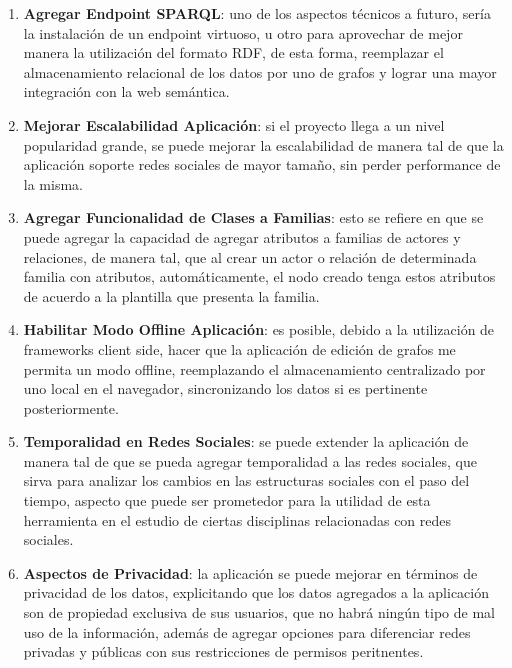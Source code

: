   \begin{enumerate}
    \item \textbf{Agregar Endpoint SPARQL}: uno de los aspectos técnicos a futuro, sería la instalación de un endpoint virtuoso, u otro para aprovechar de mejor manera la utilización del formato RDF, de esta forma, reemplazar el almacenamiento relacional de los datos por uno de grafos y lograr una mayor integración con la web semántica.
    
    \item \textbf{Mejorar Escalabilidad Aplicación}: si el proyecto llega a un nivel popularidad grande, se puede mejorar la escalabilidad de manera tal de que la aplicación soporte redes sociales de mayor tamaño, sin perder performance de la misma.
    
    \item \textbf{Agregar Funcionalidad de Clases a Familias}: esto se refiere en que se puede agregar la capacidad de agregar atributos a familias de actores y relaciones, de manera tal, que al crear un actor o relación de determinada familia con atributos, automáticamente, el nodo creado tenga estos atributos de acuerdo a la plantilla que presenta la familia.
    
    \item \textbf{Habilitar Modo Offline Aplicación}: es posible, debido a la utilización de frameworks client side, hacer que la aplicación de edición de grafos me permita un modo offline, reemplazando el almacenamiento centralizado por uno local en el navegador, sincronizando los datos si es pertinente posteriormente.
    
    \item \textbf{Temporalidad en Redes Sociales}: se puede extender la aplicación de manera tal de que se pueda agregar temporalidad a las redes sociales, que sirva para analizar los cambios en las estructuras sociales con el paso del tiempo, aspecto que puede ser prometedor para la utilidad de esta herramienta en el estudio de ciertas disciplinas relacionadas con redes sociales.
    
    \item \textbf{Aspectos de Privacidad}: la aplicación se puede mejorar en términos de privacidad de los datos, explicitando que los datos agregados a la aplicación son de propiedad exclusiva de sus usuarios, que no habrá ningún tipo de mal uso de la información, además de agregar opciones para diferenciar redes privadas y públicas con sus restricciones de permisos peritnentes.
    

\end{enumerate}
